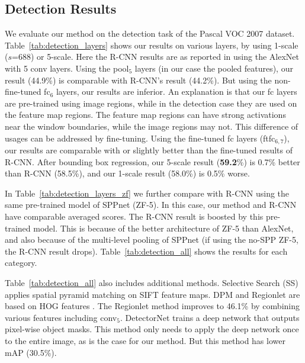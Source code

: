 \documentclass[10pt,journal,cspaper,compsoc]{IEEEtran}
\begin{document}
\subsection{Detection Results}

We evaluate our method on the detection task of the Pascal VOC 2007 dataset.
Table~\ref{tab:detection_layers} shows our results on various layers, by using 1-scale ($s$=688) or 5-scale.
Here the R-CNN results are as reported in \cite{Girshick2014} using the AlexNet \cite{Krizhevsky2012} with 5 conv layers.
Using the pool$_5$ layers (in our case the pooled features), our result (44.9\%) is comparable with R-CNN's result (44.2\%).
But using the non-fine-tuned fc$_6$ layers, our results are inferior. An explanation is that our fc layers are pre-trained using image regions, while in the detection case they are used on the feature map regions. The feature map regions can have strong activations near the window boundaries, while the image regions may not. This difference of usages can be addressed by fine-tuning. Using the fine-tuned fc layers (ftfc$_{6,7}$), our results are comparable with or slightly better than the fine-tuned results of R-CNN. After bounding box regression, our 5-scale result (\textbf{59.2}\%) is 0.7\% better than R-CNN (58.5\%), and our 1-scale result (58.0\%) is 0.5\% worse.

In Table~\ref{tab:detection_layers_zf} we further compare with R-CNN using the same pre-trained model of SPPnet (ZF-5). In this case, our method and R-CNN have comparable averaged scores. The R-CNN result is boosted by this pre-trained model. This is because of the better architecture of ZF-5 than AlexNet, and also because of the multi-level pooling of SPPnet (if using the no-SPP ZF-5, the R-CNN result drops). Table~\ref{tab:detection_all} shows the results for each category.

Table~\ref{tab:detection_all} also includes additional methods.
Selective Search (SS) \cite{Sande2011} applies spatial pyramid matching on SIFT feature maps. DPM \cite{Felzenszwalb2010} and Regionlet \cite{Wang2013} are based on HOG features \cite{Dalal2005}. The Regionlet method improves to 46.1\% \cite{Will2014} by combining various features including conv$_5$.
DetectorNet \cite{Szegedy2013} trains a deep network that outputs pixel-wise object masks. This method only needs to apply the deep network once to the entire image, as is the case for our method. But this method has lower mAP (30.5\%).
\end{document}
